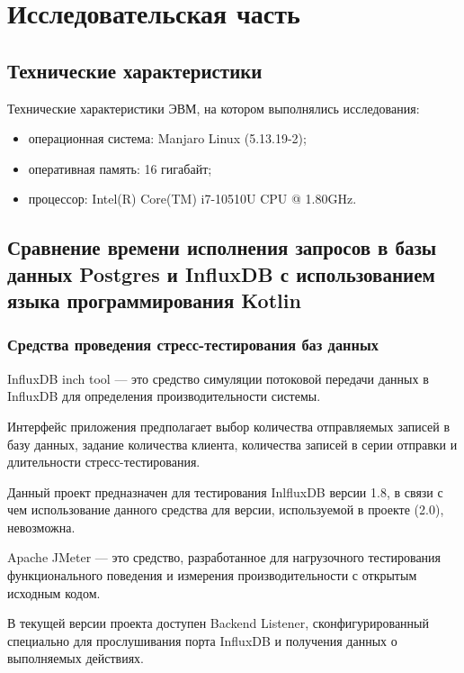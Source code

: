 \section{Исследовательская часть}

\subsection{Технические характеристики}

Технические характеристики ЭВМ, на котором выполнялись исследования:

\begin{itemize}[leftmargin=1.6\parindent]
\item операционная система: Manjaro Linux (5.13.19-2);
\item оперативная память: 16 гигабайт;
\item процессор: Intel(R) Core(TM) i7-10510U CPU @ 1.80GHz.
\end{itemize}

\subsection{Сравнение времени исполнения запросов в базы данных Postgres и InfluxDB с использованием языка программирования Kotlin}

\subsubsection{Средства проведения стресс-тестирования баз данных}

InfluxDB inch tool \cite{inchTool} --- это средство симуляции потоковой передачи данных в InfluxDB для определения производительности системы.

Интерфейс приложения предполагает выбор количества отправляемых записей в базу данных, задание количества клиента, количества записей в серии отправки и длительности стресс-тестирования.

Данный проект предназначен для тестирования InlfluxDB версии 1.8, в связи с чем использование данного средства для версии, используемой в проекте (2.0), невозможна.

Apache JMeter \cite{jmeter} --- это средство, разработанное для нагрузочного тестирования функционального поведения и измерения производительности с открытым исходным кодом.

В текущей версии проекта доступен Backend Listener, сконфигурированный специально для прослушивания порта InfluxDB и получения данных о выполняемых действиях.

